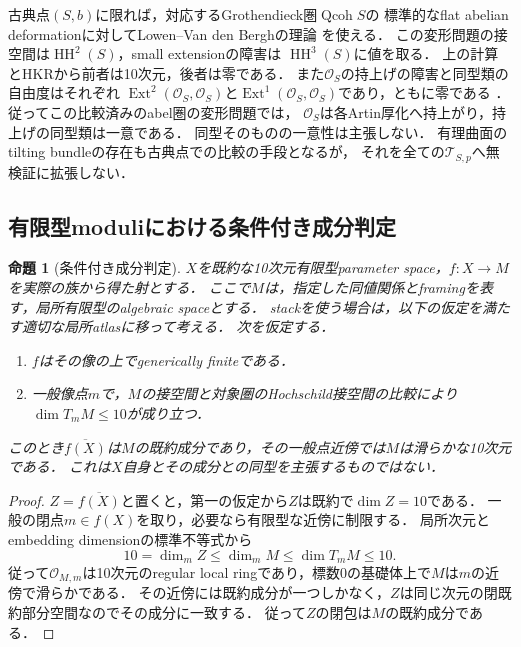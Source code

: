 \documentclass[11pt,a4paper]{ltjsarticle}
\newtheorem{proposition}[theorem]{命題}
\theoremstyle{definition}
\newcommand{\OO}{\mathcal O}
\newcommand{\TT}{\mathcal T}
\newcommand{\Ext}{\operatorname{Ext}}
\begin{document}
古典点$(S,b)$に限れば，対応するGrothendieck圏$\operatorname{Qcoh}S$の
標準的なflat abelian deformationに対してLowen--Van den Berghの理論
\cite[Theorem~3.1およびHochschild比較]{LowenVdB}を使える．
この変形問題の接空間は$\operatorname{HH}^2(S)$，small extensionの障害は
$\operatorname{HH}^3(S)$に値を取る．
上の計算とHKRから前者は10次元，後者は零である．
また$\OO_S$の持上げの障害と同型類の自由度はそれぞれ
$\Ext^2(\OO_S,\OO_S)$と$\Ext^1(\OO_S,\OO_S)$であり，ともに零である
\cite{LowenObjects}．従ってこの比較済みのabel圏の変形問題では，
$\OO_S$は各Artin厚化へ持上がり，持上げの同型類は一意である．
同型そのものの一意性は主張しない．
有理曲面のtilting bundleの存在\cite{HillePerling}も古典点での比較の手段となるが，
それを全ての$\TT_{S,p}$へ無検証に拡張しない．

\subsection{有限型moduliにおける条件付き成分判定}

\begin{proposition}[条件付き成分判定]\label{prop:component-test}
$X$を既約な10次元有限型parameter space，$f:X\to M$を実際の族から得た射とする．
ここで$M$は，指定した同値関係とframingを表す，局所有限型のalgebraic spaceとする．
stackを使う場合は，以下の仮定を満たす適切な局所atlasに移って考える．
次を仮定する．
\begin{enumerate}
\item $f$はその像の上でgenerically finiteである．
\item 一般像点$m$で，$M$の接空間と対象圏のHochschild接空間の比較により
$\dim T_mM\leq10$が成り立つ．
\end{enumerate}
このとき$\overline{f(X)}$は$M$の既約成分であり，その一般点近傍では$M$は滑らかな10次元である．
これは$X$自身とその成分との同型を主張するものではない．
\end{proposition}

\begin{proof}
$Z=\overline{f(X)}$と置くと，第一の仮定から$Z$は既約で$\dim Z=10$である．
一般の閉点$m\in f(X)$を取り，必要なら有限型な近傍に制限する．
局所次元とembedding dimensionの標準不等式から
\[
 10=\dim_m Z\leq\dim_m M\leq\dim T_mM\leq10.
\]
従って$\OO_{M,m}$は10次元のregular local ringであり，標数0の基礎体上で$M$は$m$の近傍で滑らかである．
その近傍には既約成分が一つしかなく，$Z$は同じ次元の閉既約部分空間なのでその成分に一致する．
従って$Z$の閉包は$M$の既約成分である．
\end{proof}
\end{document}
